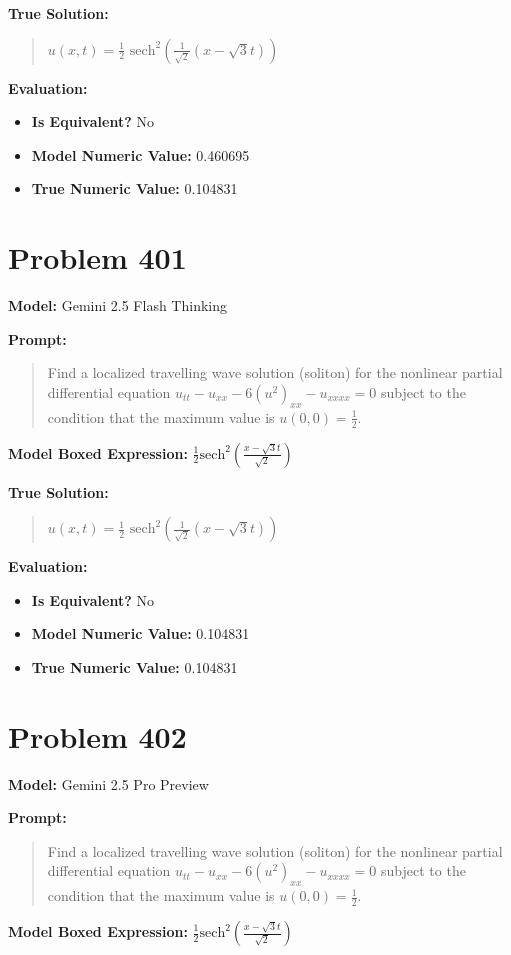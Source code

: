 \documentclass{article}
\begin{document}
\textbf{True Solution:}
\begin{quote}
$u(x,t) = \frac{1}{2} \text{ sech}^2(\frac{1}{\sqrt{2}} (x - \sqrt{3}t))$
\end{quote}

\textbf{Evaluation:}
\begin{itemize}
\item \textbf{Is Equivalent?} No
\item \textbf{Model Numeric Value:} 0.460695
\item \textbf{True Numeric Value:} 0.104831
\end{itemize}
\vspace{1cm}
\section*{Problem 401}
\textbf{Model:} Gemini 2.5 Flash Thinking

\textbf{Prompt:}
\begin{quote}
Find a localized travelling wave solution (soliton) for the nonlinear partial differential equation $u_{tt} - u_{xx} - 6 (u^2)_{xx} - u_{xxxx}=0$ subject to the condition that the maximum value is $u(0,0) = \frac{1}{2}$.
\end{quote}
\textbf{Model Boxed Expression:} $\frac{1}{2} \text{sech}^2\left(\frac{x-\sqrt{3}t}{\sqrt{2}}\right)$

\textbf{True Solution:}
\begin{quote}
$u(x,t) = \frac{1}{2} \text{ sech}^2(\frac{1}{\sqrt{2}} (x - \sqrt{3}t))$
\end{quote}

\textbf{Evaluation:}
\begin{itemize}
\item \textbf{Is Equivalent?} No
\item \textbf{Model Numeric Value:} 0.104831
\item \textbf{True Numeric Value:} 0.104831
\end{itemize}
\vspace{1cm}
\section*{Problem 402}
\textbf{Model:} Gemini 2.5 Pro Preview

\textbf{Prompt:}
\begin{quote}
Find a localized travelling wave solution (soliton) for the nonlinear partial differential equation $u_{tt} - u_{xx} - 6 (u^2)_{xx} - u_{xxxx}=0$ subject to the condition that the maximum value is $u(0,0) = \frac{1}{2}$.
\end{quote}
\textbf{Model Boxed Expression:} $\frac{1}{2} \text{sech}^2\left(\frac{x-\sqrt{3}t}{\sqrt{2}}\right)$
\end{document}
